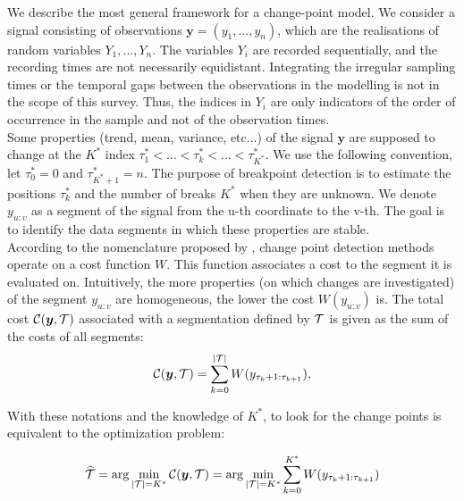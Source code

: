 We describe the most general framework for a change-point model. We consider a signal consisting of observations $\bm y = (y_1,...,y_n)$, which are the realisations of random variables $Y_1,...,Y_n$. The variables $Y_i$ are recorded sequentially, and the recording times are not necessarily equidistant. Integrating the irregular sampling times or the temporal gaps between the observations in the modelling is not in the scope of this survey. Thus, the indices in $Y_i$ are only indicators of the order of occurrence in the sample and not of the observation times. \\
Some properties (trend, mean, variance, etc...) of the signal $\bm y$ are supposed to change at the $K^*$ index $\tau^*_1 <... < \tau^*_k <... < \tau^*_{K^*}$. We use the following convention, let $\tau^*_0 = 0$ and $\tau^*_{K^*+1} = n$. The purpose of breakpoint detection is to estimate the positions $\tau^*_k$ and the number of breaks $K^*$ when they are unknown. We denote $y_{u:v}$ as a segment of the signal from the u-th coordinate to the v-th. The goal is to identify the data segments in which these properties are stable. \\
According to the nomenclature proposed by \cite{truong2020}, change point detection methods operate on a cost function $W$. This function associates a cost to the segment it is evaluated on. Intuitively, the more properties (on which changes are investigated) of the segment $y_{u:v}$ are homogeneous, the lower the cost $W(y_{u:v})$ is. The total cost ${\mathcal C}(\bm y,{\mathcal T})$ associated with a segmentation defined by ${\mathcal T}$ is given as the sum of the costs of all segments:
\begin{equation}\label{chp:3:costfunc}
{\mathcal C}(\bm y,{\mathcal T}) = \sum_{k=0}^{\lvert {\mathcal T} \rvert} W(y_{\tau_k+1:\tau_{k+1}}), 
\end{equation}     

With these notations and the knowledge of $K^*$, to look for the change points is equivalent to the optimization problem:

\begin{equation}\label{chp:3:optKknown}
 \widehat{{\mathcal T}}  = \arg \min_{\lvert {\mathcal T} \rvert = K^*}  {\mathcal C}(\bm y, {\mathcal T}) = \arg \min_{\lvert {\mathcal T} \rvert = K^*} \sum_{k=0}^{K^*} W(y_{\tau_k+1:\tau_{k+1}})   
\end{equation}

